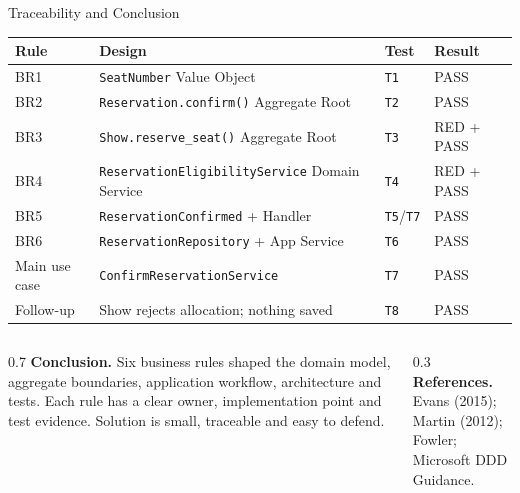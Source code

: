 \documentclass[aspectratio=169,11pt]{beamer}
\newcommand{\code}[1]{\texttt{#1}}
\begin{document}
\begin{frame}{Traceability and Conclusion}
  \centering
  \scriptsize
  \begin{tabularx}{\textwidth}{@{}l X l X@{}}
    \toprule
    \textbf{Rule} & \textbf{Design} & \textbf{Test} & \textbf{Result} \\
    \midrule
    BR1 & \code{SeatNumber} Value Object & \code{T1} & PASS \\
    BR2 & \code{Reservation.confirm()} Aggregate Root & \code{T2} & PASS \\
    BR3 & \code{Show.reserve\_seat()} Aggregate Root & \code{T3} & RED + PASS \\
    BR4 & \code{ReservationEligibilityService} Domain Service & \code{T4} & RED + PASS \\
    BR5 & \code{ReservationConfirmed} + Handler & \code{T5}/\code{T7} & PASS \\
    BR6 & \code{ReservationRepository} + App Service & \code{T6} & PASS \\
    Main use case & \code{ConfirmReservationService} & \code{T7} & PASS \\
    Follow-up & Show rejects allocation; nothing saved & \code{T8} & PASS \\
    \bottomrule
  \end{tabularx}

  \vspace{0.2cm}
  \begin{columns}
    \begin{column}{0.7\textwidth}
      {\scriptsize \textbf{Conclusion.} Six business rules shaped the domain
      model, aggregate boundaries, application workflow, architecture and
      tests. Each rule has a clear owner, implementation point and test
      evidence. Solution is small, traceable and easy to defend.}
    \end{column}
    \begin{column}{0.3\textwidth}
      {\scriptsize \textbf{References.}\\
      Evans (2015); Martin (2012); Fowler;
      Microsoft DDD Guidance.}
    \end{column}
  \end{columns}
\end{frame}
\end{document}
